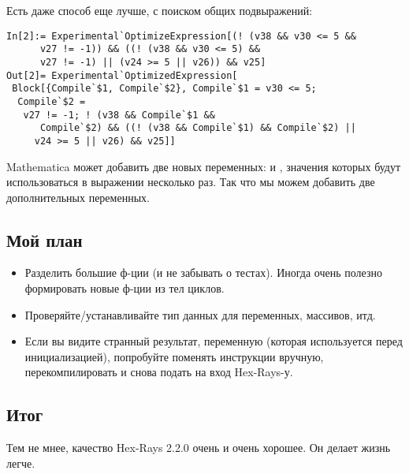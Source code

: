 Есть даже способ еще лучше, с поиском общих подвыражений:

\begin{lstlisting}
In[2]:= Experimental`OptimizeExpression[(! (v38 && v30 <= 5 &&
      v27 != -1)) && ((! (v38 && v30 <= 5) &&
      v27 != -1) || (v24 >= 5 || v26)) && v25]
Out[2]= Experimental`OptimizedExpression[
 Block[{Compile`$1, Compile`$2}, Compile`$1 = v30 <= 5;
  Compile`$2 =
   v27 != -1; ! (v38 && Compile`$1 &&
      Compile`$2) && ((! (v38 && Compile`$1) && Compile`$2) ||
     v24 >= 5 || v26) && v25]]
\end{lstlisting}

Mathematica может добавить две новых переменных:  и , значения которых будут использоваться
в выражении несколько раз.
Так что мы можем добавить две дополнительных переменных.

\subsection{Мой план}

\begin{itemize}
\item Разделить большие ф-ции (и не забывать о тестах).
Иногда очень полезно формировать новые ф-ции из тел циклов.

\item Проверяйте/устанавливайте тип данных для переменных, массивов, итд.

\item Если вы видите странный результат,  переменную (которая используется перед инициализацией),
попробуйте поменять инструкции вручную, перекомпилировать и снова подать на вход Hex-Rays-у.
\end{itemize}

\subsection{Итог}

Тем не мнее, качество Hex-Rays 2.2.0 очень и очень хорошее.
Он делает жизнь легче.

